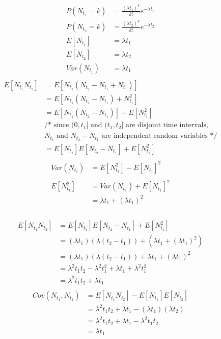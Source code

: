 \documentclass[12pt,border=4pt,multi]{article} %
\begin{document}
\begin{align*}
P(N_{t_1} = k) &= \frac{(\lambda t_1)^k}{k!} e^{-\lambda t_1}\\
P(N_{t_2} = k) &= \frac{(\lambda t_2)^k}{k!} e^{-\lambda t_2}\\
E[N_{t_1}] &= \lambda t_1\\
E[N_{t_2}] &= \lambda t_2\\
Var(N_{t_1}) &= \lambda t_1\\
\end{align*}
\begin{align*}
E[N_{t_1} N_{t_2}] &= E[N_{t_1}(N_{t_2} - N_{t_1} + N_{t_1})]\\
&= E[N_{t_1}(N_{t_2} - N_{t_1}) + N_{t_1}^2]\\
&= E[N_{t_1}(N_{t_2} - N_{t_1})] + E[N_{t_1}^2]\\
&\text{/* since $(0, t_1]$ and $(t_1, t_2]$ are disjoint time intervals,}\\
&\text{$N_{t_1}$ and $N_{t_2} - N_{t_1}$ are independent random variables */}\\
&= E[N_{t_1}]E[N_{t_2} - N_{t_1}] + E[N_{t_1}^2]\\
\end{align*}
\begin{align*}
Var(N_{t_1}) &= E[N_{t_1}^2] - E[N_{t_1}]^2\\
\\
E[N_{t_1}^2] &= Var(N_{t_1}) + E[N_{t_1}]^2\\
&= \lambda t_1 + (\lambda t_1)^2\\
\end{align*}
\\
\begin{align*}
E[N_{t_1} N_{t_2}] &= E[N_{t_1}]E[N_{t_2} - N_{t_1}] + E[N_{t_1}^2]\\
&= (\lambda t_1)(\lambda (t_2 - t_1)) + (\lambda t_1 + (\lambda t_1)^2)\\
&= (\lambda t_1)(\lambda (t_2 - t_1)) + \lambda t_1 + (\lambda t_1)^2\\
&= \lambda^2 t_1 t_2 - \lambda^2 t_1^2 + \lambda t_1 + \lambda^2 t_1^2\\
&= \lambda^2 t_1 t_2 + \lambda t_1\\
\end{align*}
\begin{align*}
Cov(N_{t_1}, N_{t_2}) &= E[N_{t_1}N_{t_2}] - E[N_{t_1}]E[N_{t_2}]\\
&= \lambda^2 t_1 t_2 + \lambda t_1 - (\lambda t_1)(\lambda t_2)\\
&= \lambda^2 t_1 t_2 + \lambda t_1 - \lambda^2 t_1 t_2\\
&= \boxed{\lambda t_1}\\
\end{align*}
\end{document}
